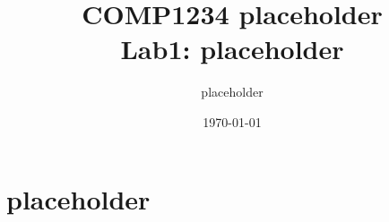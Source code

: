 \documentclass[12pt,a4paper]{article}
\title{COMP1234 placeholder\\\Large Lab1: placeholder}
\author{placeholder}
\date{\today}
\begin{document}
\maketitle
\setcounter{page}{1}
\section{placeholder}
\end{document}
